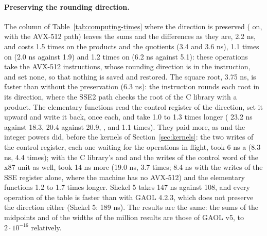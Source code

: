 \documentclass[12pt,a4paper,twoside,openright]{book}
\begin{document}
\paragraph{Preserving the rounding direction.}
The column of Table~\ref{tab:computing-times} where the direction is
preserved ( on, with the AVX-512 path)
leaves the sums and the differences as they are, 2.2 ns, and costs 1.5
times on the products and the quotients (3.4 and 3.6 ns), 1.1 times on
 (2.0 ns against 1.9) and 1.2 times on  (6.2 ns
against 5.1): these operations take the AVX-512 instructions, whose rounding
direction is in the instruction, and set none, so that nothing is saved and
restored. The square root, 3.75 ns, is faster than without the preservation
(6.3 ns): the instruction rounds each root in its direction, where the SSE2
path checks the root of the C library with a product. The elementary
functions read the control register of the direction, set it upward and
write it back, once each, and take 1.0 to 1.3 times longer (
23.2 ns against 18.3,  20.4 against 20.9, , 
and  1.1 times). They paid more, as  and the
integer powers did, before the kernels of Section~\ref{sec:kernels}: the two
writes of the control register, each one waiting for the operations in
flight, took 6 ns a  (8.3 ns, 4.4 times); with the C library's
 and  and the writes of the control
word of the x87 unit as well,  took 14 ns more (19.0 ns, 3.7
times; 8.4 ns with the writes of the SSE register alone, where the machine
has no AVX-512) and the elementary functions 1.2 to 1.7 times longer.
Shekel 5 takes 147 ns against 108, and every operation of the table is
faster than with GAOL 4.2.3, which does not preserve the direction either
(Shekel 5: 189 ns). The results are the same: the sums of the midpoints and
of the widths of the million results are those of GAOL v5, to
$2\cdot10^{-16}$ relatively.
\end{document}
